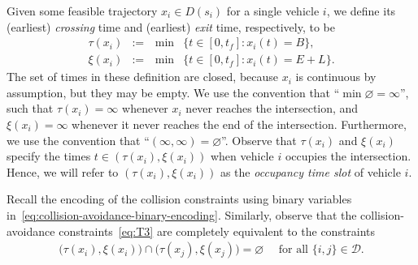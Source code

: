 \documentclass{report}
\theoremstyle{definition}
\theoremstyle{plain}
\begin{document}
 
Given some feasible trajectory $x_{i} \in D(s_{i})$ for a single vehicle $i$, we
define its (earliest) \emph{crossing} time and (earliest) \emph{exit} time,
respectively, to be
%
\begin{subequations}
\begin{alignat}{2}
  \tau(x_{i}) &:=& \, \min &\{ t \in [0, t_{f}] : x_{i}(t) = B \} , \\
  \xi(x_{i}) &:=& \, \min &\{ t \in [0, t_{f}] : x_{i}(t) = E + L \} .
\end{alignat}
\end{subequations}
%
The set of times in these definition are closed, because $x_{i}$ is continuous
by assumption, but they may be empty. We use the convention that
``$\min \varnothing = \infty$'', such that $\tau(x_{i}) = \infty$ whenever
$x_{i}$ never reaches the intersection, and 
$\xi(x_{i}) = \infty$ whenever it never reaches the end of the intersection.
Furthermore, we use the convention that ``$(\infty, \infty) = \varnothing$''.
Observe that $\tau(x_{i})$ and $\xi(x_{i})$ specify the times
$t \in (\tau(x_{i}), \xi(x_{i}))$ when vehicle $i$ occupies the
intersection.
%
Hence, we will refer to
$(\tau(x_i), \xi(x_i))$ as the \emph{occupancy time slot} of vehicle $i$.

Recall the encoding of the collision constraints using binary variables
in~\eqref{eq:collision-avoidance-binary-encoding}.
%
Similarly, observe that the collision-avoidance constraints~\eqref{eq:T3}
are completely equivalent to the constraints
\begin{align}\label{eq:disjoint-occupancy}
  \big(\tau(x_{i}), \xi(x_{i}) \big) \cap \big(\tau(x_{j}), \xi(x_{j})\big) = \varnothing \quad \text{ for all } \{i,j\} \in \mathcal{D} .
\end{align}
\end{document}
